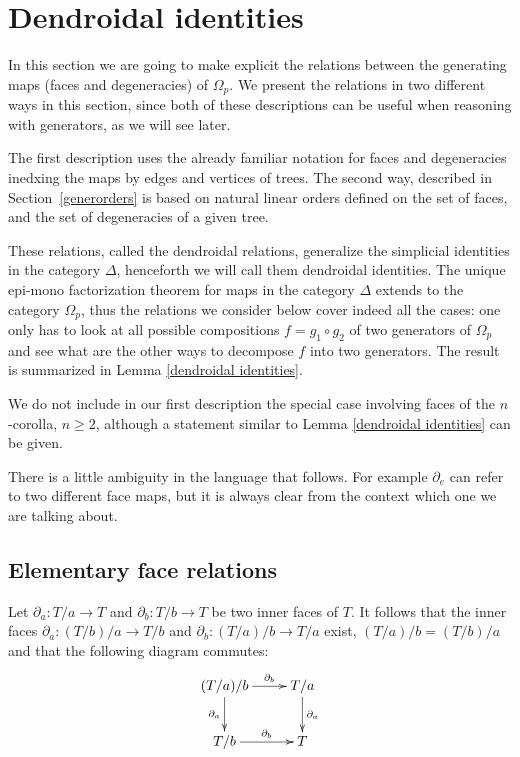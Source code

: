 \documentclass[a4paper]{amsart}
\theoremstyle{plain}
\theoremstyle{definition}
\theoremstyle{remark}
\newcommand{\rpd}{\Omega_p}
\newcommand{\To}{\longrightarrow}
\numberwithin{equation}{section}
\numberwithin{figure}{section}
\begin{document}
\section{Dendroidal identities}\label{subsec:Dendroidal_identities}
In this section we are going to make explicit the relations between the generating maps (faces and degeneracies) of $\rpd$.
We present the relations in two different ways in this section, since both of these descriptions can be useful when reasoning with generators, as we will see later.

The first description uses the already familiar notation for faces
and degeneracies inedxing the maps by edges and vertices of
trees. The second way, described in Section~\ref{generorders} is based on natural linear orders defined on
the set of faces, and the set of degeneracies of a given tree.

These relations, called the dendroidal relations, generalize the simplicial identities in the category $\Delta$,
henceforth we will call them dendroidal identities. The unique epi-mono factorization theorem for maps in the category
$\Delta$ extends to the category $\rpd$, thus the relations we consider below cover indeed all the cases: one only has to look at all possible
compositions $f=g_1\circ g_2$ of two generators of $\rpd$ and see what are the other ways to decompose $f$ into two
generators. The result is summarized in Lemma \ref{dendroidal identities}.


We do not include in our first description the special case involving faces of the $n$-corolla, $n\ge 2$, although a statement similar to Lemma \ref{dendroidal identities} can be given.

There is a little ambiguity in the language that follows. For example $\partial_e$
can refer to two different face maps, but it is always clear from the context which one we are talking about.


\subsection{Elementary face relations}
\label{faceface}
Let $\partial_a:T/a\To T$ and $\partial_b:T/b\To T$ be two inner faces of $T$. It follows that the inner
faces $\partial_a:(T/b)/a\To T/b$ and $\partial_b:(T/a)/b\To T/a$ exist, $(T/a)/b=(T/b)/a$ and that the following diagram
commutes:
$$\xymatrix{(T/a)/b\ar[r]^-{\partial_b}\ar[d]_-{\partial_a} &T/a\ar[d]^-{\partial_a}\\
T/b\ar[r]^-{\partial_b} &T}$$
\end{document}

